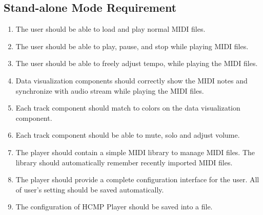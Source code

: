 \subsection{Stand-alone Mode Requirement}
\begin{enumerate}
  \item The user should be able to load and play normal MIDI files.
  \item The user should be able to play, pause, and stop while playing MIDI files.  
  \item The user should be able to freely adjust tempo, while playing the MIDI files.
  \item Data visualization components should correctly show the MIDI notes 
        and synchronize with audio stream while playing the MIDI files.
  \item Each track component should match to colors on the data visualization 
        component.
  \item Each track component should be able to mute, solo and adjust volume.  
  \item The player should contain a simple MIDI library to manage MIDI files. 
        The library should automatically remember recently imported MIDI files.
  \item The player should provide a complete configuration interface for the 
        user. All of user's setting should be saved automatically.
  \item The configuration of HCMP Player should be saved into a file.
\end{enumerate}

